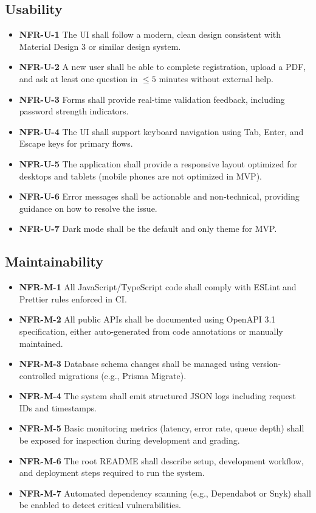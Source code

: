 \documentclass[12pt,a4paper]{article}
\begin{document}
\subsection{Usability}

\begin{itemize}
    \item \textbf{NFR-U-1} The UI shall follow a modern, clean design consistent with Material Design 3 or similar design system.
    \item \textbf{NFR-U-2} A new user shall be able to complete registration, upload a PDF, and ask at least one question in $\leq 5$ minutes without external help.
    \item \textbf{NFR-U-3} Forms shall provide real-time validation feedback, including password strength indicators.
    \item \textbf{NFR-U-4} The UI shall support keyboard navigation using Tab, Enter, and Escape keys for primary flows.
    \item \textbf{NFR-U-5} The application shall provide a responsive layout optimized for desktops and tablets (mobile phones are not optimized in MVP).
    \item \textbf{NFR-U-6} Error messages shall be actionable and non-technical, providing guidance on how to resolve the issue.
    \item \textbf{NFR-U-7} Dark mode shall be the default and only theme for MVP.
\end{itemize}

\subsection{Maintainability}

\begin{itemize}
    \item \textbf{NFR-M-1} All JavaScript/TypeScript code shall comply with ESLint and Prettier rules enforced in CI.
    \item \textbf{NFR-M-2} All public APIs shall be documented using OpenAPI 3.1 specification, either auto-generated from code annotations or manually maintained.
    \item \textbf{NFR-M-3} Database schema changes shall be managed using version-controlled migrations (e.g., Prisma Migrate).
    \item \textbf{NFR-M-4} The system shall emit structured JSON logs including request IDs and timestamps.
    \item \textbf{NFR-M-5} Basic monitoring metrics (latency, error rate, queue depth) shall be exposed for inspection during development and grading.
    \item \textbf{NFR-M-6} The root README shall describe setup, development workflow, and deployment steps required to run the system.
    \item \textbf{NFR-M-7} Automated dependency scanning (e.g., Dependabot or Snyk) shall be enabled to detect critical vulnerabilities.
\end{itemize}
\end{document}

